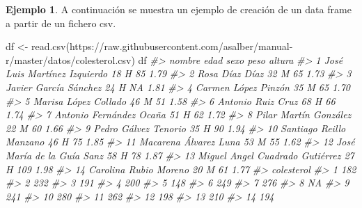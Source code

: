 \documentclass[
]{book}
\newenvironment{Shaded}{\begin{snugshade}}{\end{snugshade}}
\newcommand{\CommentTok}[1]{\textcolor[rgb]{0.56,0.35,0.01}{\textit{#1}}}
\newcommand{\FunctionTok}[1]{\textcolor[rgb]{0.00,0.00,0.00}{#1}}
\newcommand{\NormalTok}[1]{#1}
\newcommand{\OtherTok}[1]{\textcolor[rgb]{0.56,0.35,0.01}{#1}}
\newcommand{\StringTok}[1]{\textcolor[rgb]{0.31,0.60,0.02}{#1}}
\theoremstyle{definition}
\theoremstyle{definition}
\newtheorem{example}{Ejemplo}[chapter]
\theoremstyle{definition}
\theoremstyle{definition}
\theoremstyle{remark}
\begin{document}
\begin{example}

A continuación se muestra un ejemplo de creación de un data frame a partir de un fichero csv.

\begin{Shaded}
\begin{Highlighting}[]
\NormalTok{df }\OtherTok{\textless{}{-}} \FunctionTok{read.csv}\NormalTok{(}\StringTok{\textquotesingle{}https://raw.githubusercontent.com/asalber/manual{-}r/master/datos/colesterol.csv\textquotesingle{}}\NormalTok{)}
\NormalTok{df}
\CommentTok{\#\textgreater{}                             nombre edad sexo peso altura}
\CommentTok{\#\textgreater{} 1     José Luis Martínez Izquierdo   18    H   85   1.79}
\CommentTok{\#\textgreater{} 2                   Rosa Díaz Díaz   32    M   65   1.73}
\CommentTok{\#\textgreater{} 3            Javier García Sánchez   24    H   NA   1.81}
\CommentTok{\#\textgreater{} 4              Carmen López Pinzón   35    M   65   1.70}
\CommentTok{\#\textgreater{} 5             Marisa López Collado   46    M   51   1.58}
\CommentTok{\#\textgreater{} 6                Antonio Ruiz Cruz   68    H   66   1.74}
\CommentTok{\#\textgreater{} 7          Antonio Fernández Ocaña   51    H   62   1.72}
\CommentTok{\#\textgreater{} 8            Pilar Martín González   22    M   60   1.66}
\CommentTok{\#\textgreater{} 9             Pedro Gálvez Tenorio   35    H   90   1.94}
\CommentTok{\#\textgreater{} 10         Santiago Reillo Manzano   46    H   75   1.85}
\CommentTok{\#\textgreater{} 11           Macarena Álvarez Luna   53    M   55   1.62}
\CommentTok{\#\textgreater{} 12      José María de la Guía Sanz   58    H   78   1.87}
\CommentTok{\#\textgreater{} 13 Miguel Angel Cuadrado Gutiérrez   27    H  109   1.98}
\CommentTok{\#\textgreater{} 14           Carolina Rubio Moreno   20    M   61   1.77}
\CommentTok{\#\textgreater{}    colesterol}
\CommentTok{\#\textgreater{} 1         182}
\CommentTok{\#\textgreater{} 2         232}
\CommentTok{\#\textgreater{} 3         191}
\CommentTok{\#\textgreater{} 4         200}
\CommentTok{\#\textgreater{} 5         148}
\CommentTok{\#\textgreater{} 6         249}
\CommentTok{\#\textgreater{} 7         276}
\CommentTok{\#\textgreater{} 8          NA}
\CommentTok{\#\textgreater{} 9         241}
\CommentTok{\#\textgreater{} 10        280}
\CommentTok{\#\textgreater{} 11        262}
\CommentTok{\#\textgreater{} 12        198}
\CommentTok{\#\textgreater{} 13        210}
\CommentTok{\#\textgreater{} 14        194}
\end{Highlighting}
\end{Shaded}

\end{example}
\end{document}
